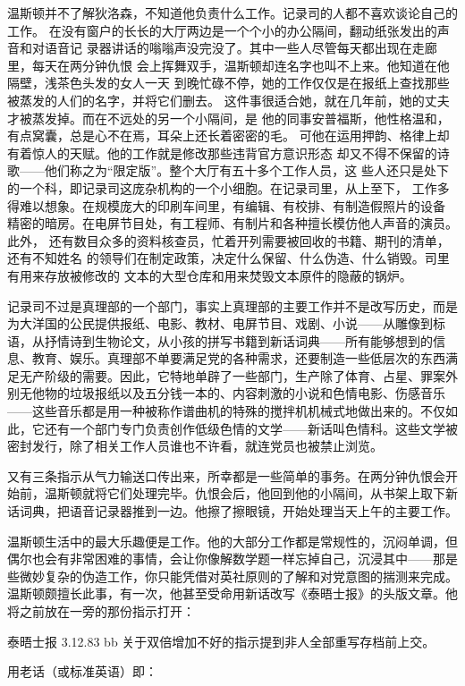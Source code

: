 温斯顿并不了解狄洛森，不知道他负责什么工作。记录司的人都不喜欢谈论自己的工作。
在没有窗户的长长的大厅两边是一个个小的办公隔间，翻动纸张发出的声音和对语音记
录器讲话的嗡嗡声没完没了。其中一些人尽管每天都出现在走廊里，每天在两分钟仇恨
会上挥舞双手，温斯顿却连名字也叫不上来。他知道在他隔壁，浅茶色头发的女人一天
到晚忙碌不停，她的工作仅仅是在报纸上查找那些被蒸发的人们的名字，并将它们删去。
这件事很适合她，就在几年前，她的丈夫才被蒸发掉。而在不远处的另一个小隔间，是
他的同事安普福斯，他性格温和，有点窝囊，总是心不在焉，耳朵上还长着密密的毛。
可他在运用押韵、格律上却有着惊人的天赋。他的工作就是修改那些违背官方意识形态
却又不得不保留的诗歌——他们称之为``限定版''。整个大厅有五十多个工作人员，这
些人还只是处下的一个科，即记录司这庞杂机构的一个小细胞。在记录司里，从上至下，
工作多得难以想象。在规模庞大的印刷车间里，有编辑、有校排、有制造假照片的设备
精密的暗房。在电屏节目处，有工程师、有制片和各种擅长模仿他人声音的演员。此外，
还有数目众多的资料核查员，忙着开列需要被回收的书籍、期刊的清单，还有不知姓名
的领导们在制定政策，决定什么保留、什么伪造、什么销毁。司里有用来存放被修改的
文本的大型仓库和用来焚毁文本原件的隐蔽的锅炉。

记录司不过是真理部的一个部门，事实上真理部的主要工作并不是改写历史，而是为大洋国的公民提供报纸、电影、教材、电屏节目、戏剧、小说——从雕像到标语，从抒情诗到生物论文，从小孩的拼写书籍到新话词典——所有能够想到的信息、教育、娱乐。真理部不单要满足党的各种需求，还要制造一些低层次的东西满足无产阶级的需要。因此，它特地单辟了一些部门，生产除了体育、占星、罪案外别无他物的垃圾报纸以及五分钱一本的、内容刺激的小说和色情电影、伤感音乐——这些音乐都是用一种被称作谱曲机的特殊的搅拌机机械式地做出来的。不仅如此，它还有一个部门专门负责创作低级色情的文学——新话叫色情科。这些文学被密封发行，除了相关工作人员谁也不许看，就连党员也被禁止浏览。

又有三条指示从气力输送口传出来，所幸都是一些简单的事务。在两分钟仇恨会开始前，温斯顿就将它们处理完毕。仇恨会后，他回到他的小隔间，从书架上取下新话词典，把语音记录器推到一边。他擦了擦眼镜，开始处理当天上午的主要工作。

温斯顿生活中的最大乐趣便是工作。他的大部分工作都是常规性的，沉闷单调，但偶尔也会有非常困难的事情，会让你像解数学题一样忘掉自己，沉浸其中——那是些微妙复杂的伪造工作，你只能凭借对英社原则的了解和对党意图的揣测来完成。温斯顿颇擅长此事，有一次，他甚至受命用新话改写《泰晤士报》的头版文章。他将之前放在一旁的那份指示打开：

泰晤士报 3.12.83 bb 关于双倍增加不好的指示提到非人全部重写存档前上交。

用老话（或标准英语）即：


